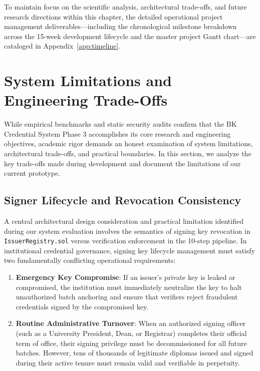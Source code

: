 To maintain focus on the scientific analysis, architectural trade-offs, and future research directions within this chapter, the detailed operational project management deliverables—including the chronological milestone breakdown across the 15-week development lifecycle and the master project Gantt chart—are cataloged in Appendix~\ref{app:timeline}.

\section{System Limitations and Engineering Trade-Offs}

While empirical benchmarks and static security audits confirm that the BK Credential System Phase 3 accomplishes its core research and engineering objectives, academic rigor demands an honest examination of system limitations, architectural trade-offs, and practical boundaries. In this section, we analyze the key trade-offs made during development and document the limitations of our current prototype.

\subsection{Signer Lifecycle and Revocation Consistency}
\label{sec:signer-lifecycle}

A central architectural design consideration and practical limitation identified during our system evaluation involves the semantics of signing key revocation in \texttt{IssuerRegistry.sol} versus verification enforcement in the 10-step pipeline. In institutional credential governance, signing key lifecycle management must satisfy two fundamentally conflicting operational requirements:
\begin{enumerate}
    \item \textbf{Emergency Key Compromise}: If an issuer's private key is leaked or compromised, the institution must immediately neutralize the key to halt unauthorized batch anchoring and ensure that verifiers reject fraudulent credentials signed by the compromised key.
    \item \textbf{Routine Administrative Turnover}: When an authorized signing officer (such as a University President, Dean, or Registrar) completes their official term of office, their signing privilege must be decommissioned for all future batches. However, tens of thousands of legitimate diplomas issued and signed during their active tenure must remain valid and verifiable in perpetuity.
\end{enumerate}

